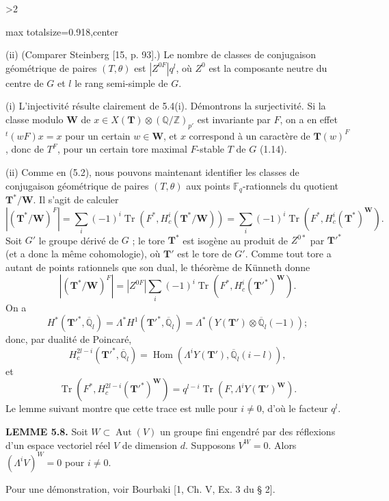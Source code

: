 \documentclass[9pt,twoside]{extarticle}
\newcommand{\EditionPage}[3]{%
  \ifnum#1>2\clearpage\fi
  \pdfbookmark[1]{Printed page #2}{fr-folio-#2}%
  \hypertarget{fr-physical-#1}{}%
  \noindent\begin{adjustbox}{max totalsize={\textwidth}{0.918\textheight},center}
  \begin{minipage}[t]{\textwidth}
  \fontsize{9.4}{11.1}\selectfont\justifying
  #3
  \end{minipage}
  \end{adjustbox}%
}
\begin{document}
\EditionPage{28}{129}{%
(ii) (Comparer Steinberg [15, p. 93].) Le nombre de classes de conjugaison géométrique de paires \((T,\theta)\) est \(|Z^{0F}|q^l\), où \(Z^0\) est la composante neutre du centre de \(G\) et \(l\) le rang semi-simple de \(G\).\par

(i) L'injectivité résulte clairement de 5.4(i). Démontrons la surjectivité. Si la classe modulo \(\mathbf W\) de \(x\in X(\mathbf T)\otimes(\mathbb Q/\mathbb Z)_{p'}\) est invariante par \(F\), on a en effet \({}^t(wF)x=x\) pour un certain \(w\in\mathbf W\), et \(x\) correspond à un caractère de \(\mathbf T(w)^F\), donc de \(T^F\), pour un certain tore maximal \(F\)-stable \(T\) de \(G\) (1.14).\par

(ii) Comme en (5.2), nous pouvons maintenant identifier les classes de conjugaison géométrique de paires \((T,\theta)\) aux points \(\mathbb F_q\)-rationnels du quotient \(\mathbf T^*/\mathbf W\). Il s'agit de calculer \[
|(\mathbf T^*/\mathbf W)^F|
=
\sum_i(-1)^i\operatorname{Tr}(F^*,H_c^i(\mathbf T^*/\mathbf W))
=
\sum_i(-1)^i\operatorname{Tr}(F^*,H_c^i(\mathbf T^*)^{\mathbf W}).
\] Soit \(G'\) le groupe dérivé de \(G\) ; le tore \(\mathbf T^*\) est isogène au produit de \(Z^{0*}\) par \(\mathbf T'^*\) (et a donc la même cohomologie), où \(\mathbf T'\) est le tore de \(G'\). Comme tout tore a autant de points rationnels que son dual, le théorème de Künneth donne \[
|(\mathbf T^*/\mathbf W)^F|
=
|Z^{0F}|\sum_i(-1)^i\operatorname{Tr}(F^*,H_c^i(\mathbf T'^*)^{\mathbf W}).
\] On a \[
H^*(\mathbf T'^*,\overline{\mathbb Q}_l)
=
\Lambda^*H^1(\mathbf T'^*,\overline{\mathbb Q}_l)
=
\Lambda^*(Y(\mathbf T')\otimes\overline{\mathbb Q}_l(-1));
\] donc, par dualité de Poincaré, \[
H_c^{2l-i}(\mathbf T'^*,\overline{\mathbb Q}_l)
=
\operatorname{Hom}(\Lambda^iY(\mathbf T'),\overline{\mathbb Q}_l(i-l)),
\] et \[
\operatorname{Tr}(F^*,H_c^{2l-i}(\mathbf T'^*)^{\mathbf W})
=
q^{l-i}\operatorname{Tr}(F,\Lambda^iY(\mathbf T')^{\mathbf W}).
\] Le lemme suivant montre que cette trace est nulle pour \(i\ne0\), d'où le facteur \(q^l\).\par

\noindent\textbf{LEMME 5.8.} Soit \(W\subset\operatorname{Aut}(V)\) un groupe fini engendré par des réflexions d'un espace vectoriel réel \(V\) de dimension \(d\). Supposons \(V^W=0\). Alors \((\Lambda^iV)^W=0\) pour \(i\ne0\).\par

Pour une démonstration, voir Bourbaki [1, Ch. V, Ex. 3 du § 2].\par

}
\end{document}
